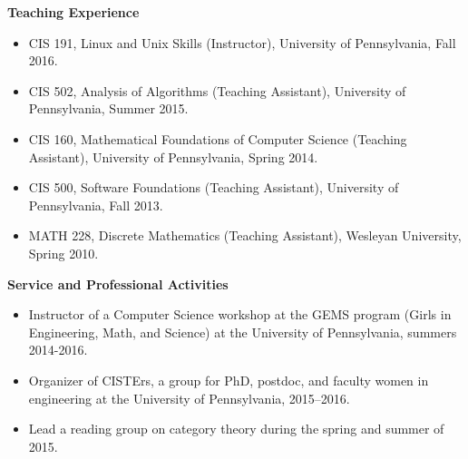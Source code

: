\documentclass[letterpaper,11pt]{article}
\makeatletter
\newcommand{\resitem}[1]{\item #1 \vspace{-2pt}}
\newcommand{\resheading}[1]{{\large \colorbox{mygrey}{\begin{minipage}{\textwidth}{\textbf{#1 \vphantom{p\^{E}}}}\end{minipage}}}}
\newcommand{\ressubheading}[4]{
\begin{tabular*}{7in}{l@{\extracolsep{\fill}}r} 
		\textbf{#1} & #2 \\
		\textit{#3} & \textit{#4} \\
\end{tabular*}\vspace{-2pt}}
\makeatother
\begin{document}
\newpage
\resheading{Teaching Experience}
\begin{itemize}
    \item{CIS 191, Linux and Unix Skills (Instructor),
        University of Pennsylvania, Fall 2016.}


    \item{CIS 502, Analysis of Algorithms (Teaching Assistant),
        University of Pennsylvania, Summer 2015.}

    \item{CIS 160, Mathematical Foundations of Computer Science (Teaching
        Assistant),
        University of Pennsylvania, Spring 2014.}

    \item{CIS 500, Software Foundations (Teaching Assistant),
        University of Pennsylvania, Fall 2013.}

    \item{MATH 228, Discrete Mathematics (Teaching Assistant),
        Wesleyan University, Spring 2010.}

        


\end{itemize}
\vspace{7pt}


\resheading{Service and Professional Activities}
\begin{itemize}

\item{Instructor of a Computer Science workshop at the GEMS program (Girls in
    Engineering, Math, and Science) at the University of Pennsylvania, summers
    2014-2016.}


    \item{Organizer of CISTErs, a group for PhD, postdoc, and faculty
        women in engineering at the University of Pennsylvania, 2015--2016.}

    \item{Lead a reading group on category theory during the spring and summer
        of 2015.}

\end{itemize}
\end{document}
